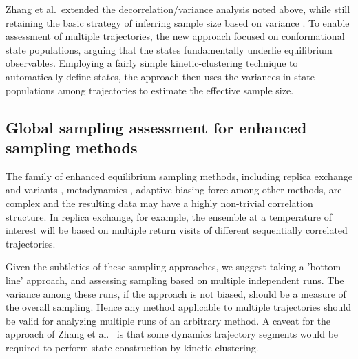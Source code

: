 Zhang et al.\ extended the decorrelation/variance analysis noted above, while still retaining the basic strategy of inferring sample size based on variance \cite{Zhang2010}.
To enable assessment of multiple trajectories, the new approach focused on conformational state populations, arguing that the states fundamentally underlie equilibrium observables.
Employing a fairly simple kinetic-clustering technique to automatically define states, the approach then uses the variances in state populations among trajectories to estimate the effective sample size.


\subsection{Global sampling assessment for enhanced sampling methods}
The family of enhanced equilibrium sampling methods, including replica exchange and variants \cite{Swendsen-1986,Sugita1999,Okamoto-2000}, metadynamics \cite{Bussi2006a,Laio2008}, adaptive biasing force \cite{Darve2001,Darve2008,Comer2015} among other methods, are complex and the resulting data may have a highly non-trivial correlation structure.
In replica exchange, for example, the ensemble at a temperature of interest will be based on multiple return visits of different sequentially correlated trajectories.

Given the subtleties of these sampling approaches, we suggest taking a 'bottom line' approach, and assessing sampling based on multiple independent runs.
The variance among these runs, if the approach is not biased, should be a measure of the overall sampling.
Hence any method applicable to multiple trajectories should be valid for analyzing multiple runs of an arbitrary method.
A caveat for the approach of Zhang et al.\ \cite{Zhang2010} is that some dynamics trajectory segments would be required to perform state construction by kinetic clustering.

